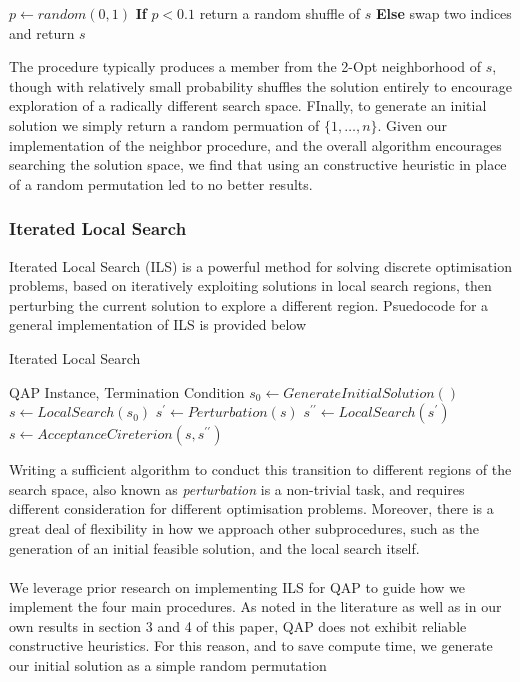 \documentclass[a4paper,10pt]{article}
\begin{document}
\begin{algorithm}
\begin{algorithmic}
        \State $p\gets random(0,1)$
        \State \textbf{If} $p<0.1$ return a random shuffle of $s$
        \State \textbf{Else} swap two indices and return $s$ 
    \EndProcedure
\end{algorithmic}
\end{algorithm}

The procedure typically produces a member from the 2-Opt neighborhood of $s$, though with relatively small probability shuffles the solution entirely to encourage exploration of a radically different search space. FInally, to generate an initial solution we simply return a random permuation of $\{1,\dots,n\}$. Given our implementation of the neighbor procedure, and the overall algorithm encourages searching the solution space, we find that using an constructive heuristic in place of a random permutation led to no better results. 

\subsubsection*{Iterated Local Search}
Iterated Local Search (ILS) is a powerful method for solving discrete optimisation problems, based on iteratively exploiting solutions in local search regions, then perturbing the current solution to explore a different region. Psuedocode for a general implementation of ILS is provided below

\begin{algorithm}
\caption{Iterated Local Search}\label{alg:cap}
\begin{algorithmic}
\Require QAP Instance, Termination Condition
\State $s_0 \gets GenerateInitialSolution()$
\State $s \gets LocalSearch(s_0)$
    \State $s^\prime \gets Perturbation(s)$
    \State $s^{\prime\prime} \gets LocalSearch(s^\prime)$
    \State $s \gets AcceptanceCireterion(s,s^{\prime\prime})$
\EndWhile
\end{algorithmic}
\end{algorithm}
Writing a sufficient algorithm to conduct this transition to different regions of the search space, also known as \textit{perturbation} is a non-trivial task, and requires different consideration for different optimisation problems. Moreover, there is a great deal of flexibility in how we approach other subprocedures, such as the generation of an initial feasible solution, and the local search itself. \\
\\
We leverage prior research on implementing ILS for QAP \cite{stuzle} to guide how we implement the four main procedures.  As noted in the literature \cite{Loiola07, stuzle} as well as in our own results in section 3 and 4 of this paper, QAP does not exhibit reliable constructive heuristics. For this reason, and to save compute time, we generate our initial solution as a simple random permutation
\end{document}
